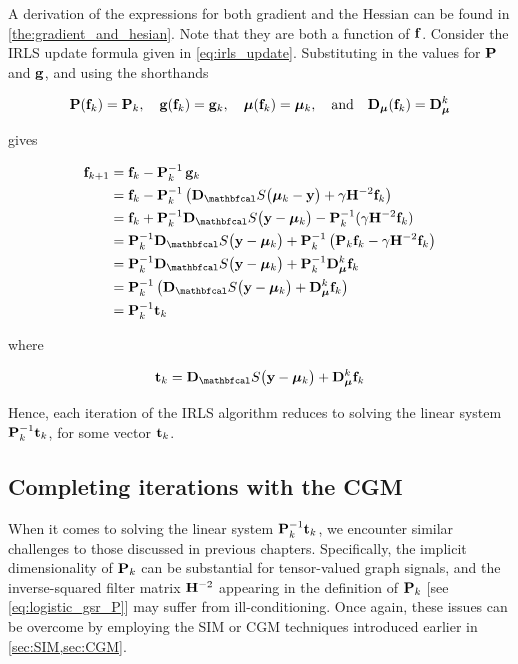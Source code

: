 A derivation of the expressions for both gradient and the Hessian can be found in \cref{the:gradient_and_hesian}. Note that they are both a function of $\mathbf{f}$. Consider the IRLS update formula given in \cref{eq:irls_update}. Substituting in the values for $\mathbf{P}$ and $\mathbf{g}$, and using the shorthands

\begin{equation*}
    \mathbf{P}(\mathbf{f}_k) = \mathbf{P}_k, \quad \mathbf{g}(\mathbf{f}_k) = \mathbf{g}_k, \quad \boldsymbol{\mu}(\mathbf{f}_k) = \boldsymbol{\mu}_k, \quad \text{and} \quad \mathbf{D}_{\boldsymbol{\mu}}(\mathbf{f}_k) = \mathbf{D}_{\boldsymbol{\mu}}^k
\end{equation*}

gives

\begin{align*}
    \f_{k+1} &= \f_k - \PP^{-1}_k \, \g_k\\
    &= \f_{k} - \PP^{-1}_k \left(\D_\St \big(\muu_k - \y\big) + \gamma \HH^{-2} \f_k\right) \\
    &= \f_k + \PP^{-1}_k \D_\St \big(\y - \muu_k\big) - \PP^{-1}_k (\gamma \HH^{-2} \f_k) \\
    &= \PP^{-1}_k \D_\St \big(\y - \muu_k \big) + \PP^{-1}_k \left(\PP_k \f_k - \gamma \HH^{-2} \f_k\right) \\
    &= \PP^{-1}_k \D_\St \big(\y - \muu_k \big) + \PP^{-1}_k \D_{\muu}^k\f_k  \\
    &= \PP^{-1}_k \left(\D_\St \big(\y - \muu_k \big) + \D_{\muu}^k\f_k \right) \\
    &= \PP^{-1}_k \tee_k
\end{align*}

where

\begin{equation}
    \tee_k = \D_\St \big(\y - \muu_k\big) + \D_{\muu}^k \f_k
\end{equation}

Hence, each iteration of the IRLS algorithm reduces to solving the linear system $\mathbf{P}^{-1}_k \mathbf{t}_k$, for some vector $\mathbf{t}_k$. 

\subsection{Completing iterations with the CGM}

When it comes to solving the linear system $\mathbf{P}^{-1}_k \mathbf{t}_k$, we encounter similar challenges to those discussed in previous chapters. Specifically, the implicit dimensionality of $\mathbf{P}_k$ can be substantial for tensor-valued graph signals, and the inverse-squared filter matrix $\mathbf{H}^{-2}$ appearing in the definition of $\mathbf{P}_k$ [see \cref{eq:logistic_gsr_P}] may suffer from ill-conditioning. Once again, these issues can be overcome by employing the SIM or CGM techniques introduced earlier in \cref{sec:SIM,sec:CGM}.


